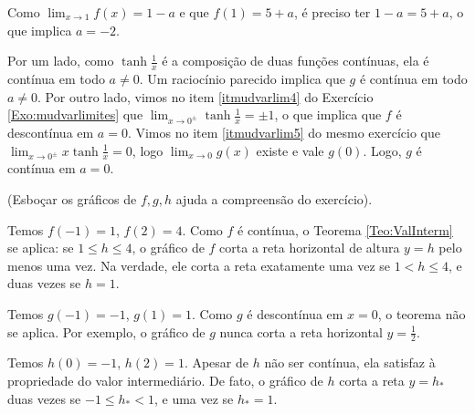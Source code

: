 \begin{Solution}{5.4}
Como $\lim_{x\to 1}f(x)=1-a$ e que $f(1)=5+a$, é preciso ter $1-a=5+a$, o que implica
$a=-2$.
\end{Solution}
\begin{Solution}{5.5}
Por um lado, como $\tanh \tfrac1x$ é a composição de duas funções contínuas, ela é
contínua em todo $a\neq 0$.
Um raciocínio parecido implica que $g$ é contínua em todo $a\neq 0$.
Por outro lado,
vimos no item \eqref{itmudvarlim4} do Exercício \ref{Exo:mudvarlimites} que $\lim_{x\to
0^{\pm}}\tanh \frac{1}{x}=\pm 1$, o que implica que $f$ é descontínua em $a=0$.
Vimos no item \eqref{itmudvarlim5} do mesmo exercício que $\lim_{x\to
0^{\pm}}x\tanh \frac{1}{x}=0$, logo $\lim_{x\to 0}g(x)$ existe e vale $g(0)$.
Logo, $g$ é contínua em $a=0$.
\begin{center}
\begin{bmlimage}\end{bmlimage}
\end{center}
\end{Solution}
\begin{Solution}{5.6}
(Esboçar os gráficos de $f,g,h$ ajuda a compreensão do exercício).

Temos $f(-1)=1$, $f(2)=4$.
Como $f$ é contínua, o Teorema \eqref{Teo:ValInterm} se aplica:
se $1\leq h\leq 4$, o gráfico de $f$ corta a reta horizontal de
altura $y=h$ pelo menos uma vez. Na verdade, ele corta a reta
exatamente uma vez se $1<h\leq 4$, e duas vezes se $h=1$.

Temos $g(-1)=-1$, $g(1)=1$.
Como $g$ é descontínua em $x=0$, o teorema não se aplica. Por
exemplo, o gráfico de $g$ nunca corta a reta horizontal $y=\frac12$.

Temos $h(0)=-1$, $h(2)=1$. Apesar de $h$ não ser contínua, ela
satisfaz à propriedade do valor intermediário. De fato, o gráfico de
$h$ corta a reta $y=h_*$ duas vezes se $-1\leq h_*<1$, e uma vez se $h_*=1$.
\end{Solution}
